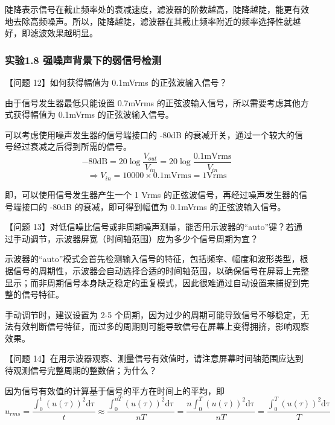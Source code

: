 \documentclass[dvipsnames, svgnames,a4paper,11pt]{article}
\begin{document}
		陡降表示信号在截止频率处的衰减速度，滤波器的阶数越高，陡降越陡，能更有效地去除高频噪声。所以，陡降越陡，滤波器在其截止频率附近的频率选择性就越好，即滤波效果越明显。





	\subsubsection*{实验1.8 \quad 强噪声背景下的弱信号检测}

		【问题 12】如何获得幅值为 0.1mVrms 的正弦波输入信号？

		由于信号发生器最低只能设置 0.7mVrms 的正弦波输入信号，所以需要考虑其他方式获得幅值为 0.1mVrms 的正弦波输入信号。

		可以考虑使用噪声发生器的信号端接口的 -80dB 的衰减开关，通过一个较大的信号经过衰减之后得到所需的信号。
		\[
			- 80 \mathrm{dB} = 20 \log \frac{V_{out}}{V_{in}} = 20 \log \frac{0.1 \mathrm{mVrms}}{V_{in}}
		\]
		\[
			\Rightarrow V_{in} = 10000 \times 0.1 \mathrm{mVrms} = 1 \mathrm{Vrms}
		\]

		即，可以使用信号发生器产生一个 1 Vrms 的正弦波信号，再经过噪声发生器的信号端接口的 -80dB 的衰减，即可得到幅值为 0.1mVrms 的正弦波输入信号。


		\vspace{0.05\textwidth} %


		【问题 13】对低信噪比信号或非周期噪声测量，能否用示波器的“auto”键？若通过手动调节，示波器屏宽（时间轴范围）应为多少个信号周期为宜？

		示波器的“auto”模式会首先检测输入信号的特征，包括频率、幅度和波形类型，根据信号的周期性，示波器会自动选择合适的时间轴范围，以确保信号在屏幕上完整显示；而非周期信号本身缺乏稳定的重复模式，因此很难通过自动设置来捕捉到完整的信号特征。

		手动调节时，建议设置为 2-5 个周期，因为过少的周期可能导致信号不够稳定，无法有效判断信号特征，而过多的周期则可能导致信号在屏幕上变得拥挤，影响观察效果。


		\vspace{0.05\textwidth} %


		【问题 14】在用示波器观察、测量信号有效值时，请注意屏幕时间轴范围应达到待观测信号完整周期的整数倍；为什么？

		因为信号有效值的计算基于信号的平方在时间上的平均，即
		\[
			u_{rms} = \frac{\int_0^{t} (u(\tau))^2 \mathrm{d\tau}}{t} \approx \frac{\int_0^{nT} (u(\tau))^2 \mathrm{d\tau}}{nT} = \frac{n\int_0^{T} (u(\tau))^2 \mathrm{d\tau}}{nT} = \frac{\int_0^{T} (u(\tau))^2 \mathrm{d\tau}}{T}
		\]
\end{document}
